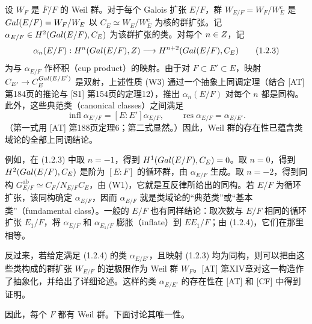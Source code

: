 设 $W_F$ 是 $\overline F/F$ 的 Weil 群。对于每个 Galois 扩张 $E/F$，群 $W_{E/F}=W_F/W_E^c$ 是 $Gal(E/F)=W_F/W_E$ 以 $C_E\simeq W_E/W_E^c$ 为核的群扩张。记 $\alpha_{E/F}\in H^2(Gal(E/F),C_E)$ 为该群扩张的类。对每个 $n\in Z$，记
\begin{equation}
 \alpha_n(E/F):H^n(Gal(E/F),Z)\longrightarrow H^{n+2}(Gal(E/F),C_E)\tag{1.2.3}
\end{equation}
为与 $\alpha_{E/F}$ 作杯积（cup product）的映射。由于对 $F\subset E'\subset E$，映射 $C_{E'}\to C_E^{Gal(E/E')}$ 是双射，上述性质 (W3) 通过一个抽象上同调定理（结合 [AT] 第184页的推论与 [S1] 第154页的定理12），推出 $\alpha_n(E/F)$ 对每个 $n$ 都是同构。此外，这些典范类（canonical classes）之间满足
\begin{equation}
 \operatorname{infl}\alpha_{E'/F}=[E:E']\alpha_{E/F},\qquad
 \operatorname{res}\alpha_{E/F}=\alpha_{E/E'}.\tag{1.2.4}
\end{equation}
（第一式用 [AT] 第188页定理6；第二式显然。）因此，Weil 群的存在性已蕴含类域论的全部上同调结论。

例如，在 (1.2.3) 中取 $n=-1$，得到 $H^1(Gal(E/F),C_E)=0$。取 $n=0$，得到 $H^2(Gal(E/F),C_E)$ 是阶为 $[E:F]$ 的循环群，由 $\alpha_{E/F}$ 生成。取 $n=-2$，得到同构 $G_{E/F}^{\mathrm{ab}}\simeq C_F/N_{E/F}C_E$，由 (W1)，它就是互反律所给出的同构。若 $E/F$ 为循环扩张，该同构确定 $\alpha_{E/F}$，因而 $\alpha_{E/F}$ 就是类域论的“典范类”或“基本类”（fundamental class）。一般的 $E/F$ 也有同样结论：取次数与 $E/F$ 相同的循环扩张 $E_1/F$，将 $\alpha_{E/F}$ 和 $\alpha_{E_1/F}$ 膨胀（inflate）到 $EE_1/F$；由 (1.2.4)，它们在那里相等。

反过来，若给定满足 (1.2.4) 的类 $\alpha_{E/E'}$，且映射 (1.2.3) 均为同构，则可以把由这些类构成的群扩张 $W_{E/F}$ 的逆极限作为 Weil 群 $W_F$。[AT] 第XIV章对这一构造作了抽象化，并给出了详细论述。这样的类 $\alpha_{E/E'}$ 的存在性在 [AT] 和 [CF] 中得到证明。

因此，每个 $F$ 都有 Weil 群。下面讨论其唯一性。

